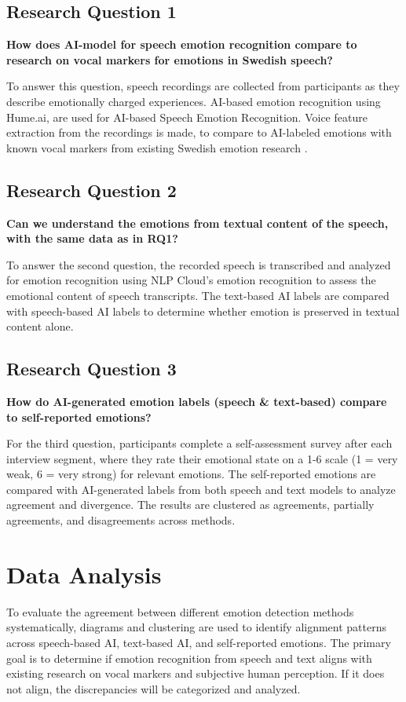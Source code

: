 \subsection{Research Question 1}
\textbf{How does AI-model for speech emotion recognition compare to research on vocal markers for emotions in Swedish speech?}

To answer this question, speech recordings are collected from participants as they describe emotionally charged experiences. AI-based emotion recognition using Hume.ai, are used for AI-based Speech Emotion Recognition. Voice feature extraction from the recordings is made, to compare to AI-labeled emotions with known vocal markers from existing Swedish emotion research \autocite{Ekberg2023}. 

\subsection{Research Question 2}
\textbf{Can we understand the emotions from textual content of the speech, with the same data as in RQ1? }

To answer the second question, the recorded speech is transcribed and analyzed for emotion recognition using NLP Cloud’s emotion recognition to assess the emotional content of speech transcripts. The text-based AI labels are compared with speech-based AI labels to determine whether emotion is preserved in textual content alone. 

\subsection{Research Question 3}
\textbf{How do AI-generated emotion labels (speech \& text-based) compare to self-reported emotions? }

For the third question, participants complete a self-assessment survey after each interview segment, where they rate their emotional state on a 1-6 scale (1 = very weak, 6 = very strong) for relevant emotions. The self-reported emotions are compared with AI-generated labels from both speech and text models to analyze agreement and divergence. The results are clustered as agreements, partially agreements, and disagreements across methods. 


\section{Data Analysis}
To evaluate the agreement between different emotion detection methods systematically, diagrams and clustering are used to identify alignment patterns across speech-based AI, text-based AI, and self-reported emotions. The primary goal is to determine if emotion recognition from speech and text aligns with existing research on vocal markers and subjective human perception. If it does not align, the discrepancies will be categorized and analyzed. 

